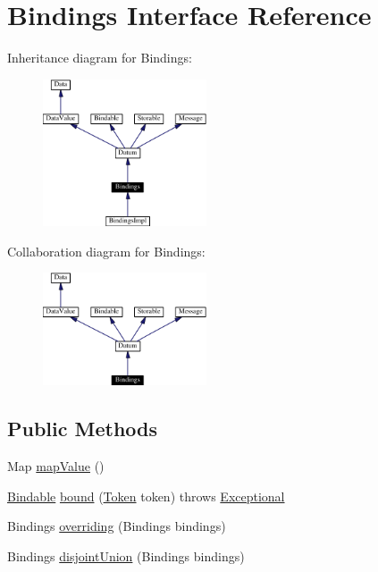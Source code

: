 \hypertarget{interfaceBindings}{
\section{Bindings  Interface Reference}
\label{interfaceBindings}
}
Inheritance diagram for Bindings:\begin{figure}[H]
\begin{center}
\leavevmode
\includegraphics[width=137pt]{interfaceBindings__inherit__graph}
\end{center}
\end{figure}
Collaboration diagram for Bindings:\begin{figure}[H]
\begin{center}
\leavevmode
\includegraphics[width=137pt]{interfaceBindings__coll__graph}
\end{center}
\end{figure}
\subsection*{Public Methods}
\begin{CompactItemize}
\item 
Map \hyperlink{interfaceBindings_a0}{map\-Value} ()
\item 
\hyperlink{interfaceBindable}{Bindable} \hyperlink{interfaceBindings_a1}{bound} (\hyperlink{interfaceToken}{Token} token) throws \hyperlink{classExceptional}{Exceptional}
\item 
Bindings \hyperlink{interfaceBindings_a2}{overriding} (Bindings bindings)
\item 
Bindings \hyperlink{interfaceBindings_a3}{disjoint\-Union} (Bindings bindings)
\end{CompactItemize}


